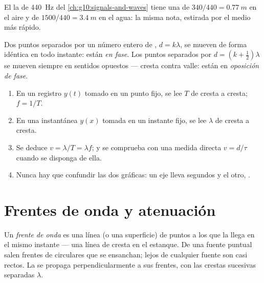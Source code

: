 \begin{example}\label{ex:g12:mechanical-waves:concertA}
El la de \qty{440}{Hz} del \cref{ch:g10:signals-and-waves} tiene una
 de $340/440 = \qty{0.77}{m}$ en el aire y de
$1500/440 = \qty{3.4}{m}$ en el agua: la misma nota, estirada por el
medio más rápido.
\end{example}

\begin{definition}\label{def:g12:mechanical-waves:phase}
Dos puntos separados por un número entero de ,
$d = k\lambda$, se mueven de forma idéntica en todo instante: están
\emph{en fase}. Los puntos separados por
$d = (k + \tfrac12)\lambda$ se mueven siempre en sentidos opuestos ---
cresta contra valle: están en \emph{oposición de fase}.
\end{definition}

\begin{method}\label{met:g12:mechanical-waves:reading}
\begin{enumerate}
  \item En un registro $y(t)$ tomado en un punto fijo, se lee $T$ de
        cresta a cresta; $f = 1/T$.
  \item En una instantánea $y(x)$ tomada en un instante fijo, se lee
        $\lambda$ de cresta a cresta.
  \item Se deduce $v = \lambda/T = \lambda f$; y se comprueba con una
        medida directa $v = d/\tau$ cuando se disponga de ella.
  \item Nunca hay que confundir las dos gráficas: un eje lleva segundos
        y el otro, .
\end{enumerate}
\end{method}

\section{Frentes de onda y atenuación}

\begin{definition}\label{def:g12:mechanical-waves:wavefront}
Un \emph{frente de onda} es una línea (o una
superficie) de puntos a los que la  llega en el mismo instante ---
una línea de cresta en el estanque. De una fuente puntual salen frentes
de  circulares que se ensanchan; lejos de cualquier fuente son casi
rectos. La  se propaga perpendicularmente a sus frentes, con las
crestas sucesivas separadas $\lambda$.
\end{definition}

